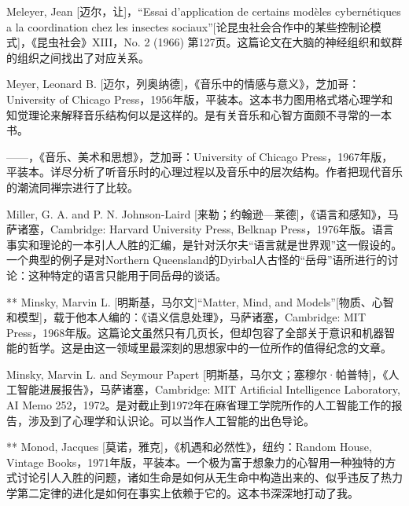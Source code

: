 \begin{thebib}
\begin{biblist}
\item Meleyer, Jean [迈尔，让]，“Essai d'application de certains modèles cybernétiques a la coordination chez les insectes sociaux”[论昆虫社会合作中的某些控制论模式]，《昆虫社会》XIII，No. 2 (1966) 第127页。这篇论文在大脑的神经组织和蚁群的组织之间找出了对应关系。

\item Meyer, Leonard B. [迈尔，列奥纳德]，《音乐中的情感与意义》，芝加哥：University of Chicago Press，1956年版，平装本。这本书力图用格式塔心理学和知觉理论来解释音乐结构何以是这样的。是有关音乐和心智方面颇不寻常的一本书。

\item ——，《音乐、美术和思想》，芝加哥：University of Chicago Press，1967年版，平装本。详尽分析了听音乐时的心理过程以及音乐中的层次结构。作者把现代音乐的潮流同禅宗进行了比较。

\item Miller, G. A. and P. N. Johnson-Laird [来勒；约翰逊—莱德]，《语言和感知》，马萨诸塞，Cambridge: Harvard University Press, Belknap Press，1976年版。语言事实和理论的一本引人人胜的汇编，是针对沃尔夫“语言就是世界观”这一假设的。一个典型的例子是对Northern Queensland的Dyirbal人古怪的“岳母”语所进行的讨论：这种特定的语言只能用于同岳母的谈话。

\item[**] Minsky, Marvin L. [明斯基，马尔文]“Matter, Mind, and Models”[物质、心智和模型]，载于他本人编的：《语义信息处理》，马萨诸塞，Cambridge: MIT Press，1968年版。这篇论文虽然只有几页长，但却包容了全部关于意识和机器智能的哲学。这是由这一领域里最深刻的思想家中的一位所作的值得纪念的文章。

\item Minsky, Marvin L. and Seymour Papert [明斯基，马尔文；塞穆尔·帕普特]，《人工智能进展报告》，马萨诸塞，Cambridge: MIT Artificial Intelligence Laboratory, AI Memo 252，1972。是对截止到1972年在麻省理工学院所作的人工智能工作的报告，涉及到了心理学和认识论。可以当作人工智能的出色导论。

\item[**] Monod, Jacques [莫诺，雅克]，《机遇和必然性》，纽约：Random House, Vintage Books，1971年版，平装本。一个极为富于想象力的心智用一种独特的方式讨论引人入胜的问题，诸如生命是如何从无生命中构造出来的、似乎违反了热力学第二定律的进化是如何在事实上依赖于它的。这本书深深地打动了我。


\end{biblist}
\end{thebib}
